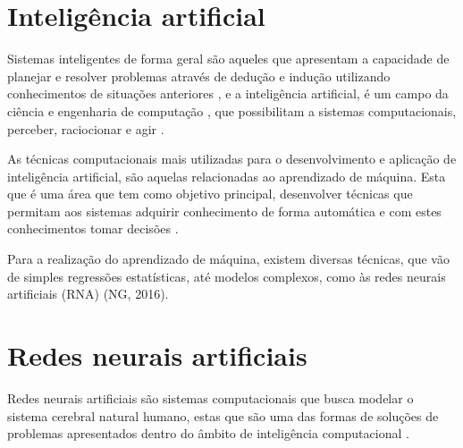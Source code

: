 \section{Inteligência artificial}



\par Sistemas inteligentes de forma geral são aqueles que apresentam a capacidade de planejar e resolver problemas através de dedução e indução utilizando conhecimentos de situações anteriores \cite{VonZuben2013}, e a inteligência artificial, é um campo da ciência e engenharia de computação \cite{VonZuben2013}, que possibilitam a sistemas computacionais, perceber, raciocionar e agir \cite{Winston1992}.

\par As técnicas computacionais mais utilizadas para o desenvolvimento e aplicação de inteligência artificial, são aquelas relacionadas ao aprendizado de máquina. Esta que é uma área que tem como objetivo principal, desenvolver técnicas que permitam aos sistemas adquirir conhecimento de forma automática e com estes conhecimentos tomar decisões \cite{Augusto2007}.

\par Para a realização do aprendizado de máquina, existem diversas técnicas, que vão de simples regressões estatísticas, até modelos complexos, como às redes neurais artificiais (RNA) (NG, 2016).

\section{Redes neurais artificiais}


\par Redes neurais artificiais são sistemas computacionais que busca modelar o sistema cerebral natural humano, estas que são uma das formas de soluções de problemas apresentados dentro do âmbito de inteligência computacional \cite{Cintra2019}.

